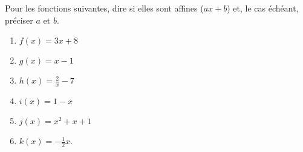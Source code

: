 
\begin{exercice}\label{exosmath-0149}

    Pour les fonctions suivantes, dire si elles sont affines (\( ax+b\)) et, le cas échéant, préciser \( a\) et \( b\).
    \begin{multicols}{3}
        \begin{enumerate}
            \item
                \( f(x)=3x+8\)
            \item
                \( g(x)=x-1\)
            \item
                \( h(x)=\frac{ 2 }{ x }-7\)
            \item
                \( i(x)=1-x\)
            \item
                \( j(x)=x^2+x+1\)
            \item
                \( k(x)=-\frac{ 1 }{2}x\).
        \end{enumerate}
    \end{multicols}

\end{exercice}
